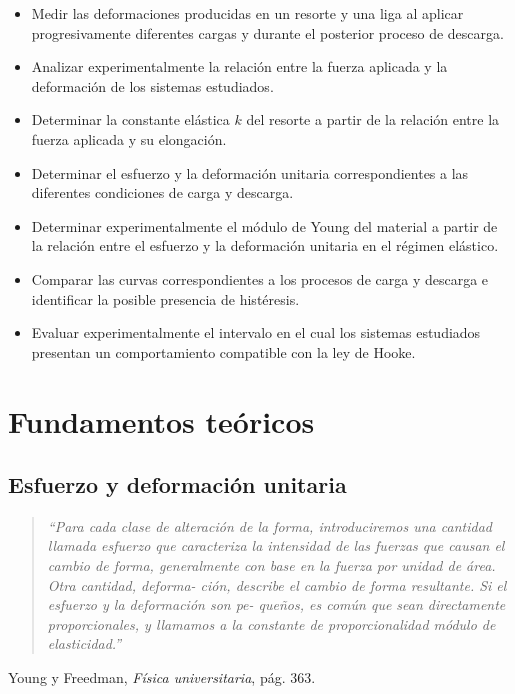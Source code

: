 \documentclass[11pt,a4paper]{article}
\begin{document}
\begin{itemize}
    \item Medir las deformaciones producidas en un resorte y una liga al aplicar progresivamente diferentes cargas y durante el posterior proceso de descarga.

    \item Analizar experimentalmente la relación entre la fuerza aplicada y la deformación de los sistemas estudiados.

    \item Determinar la constante elástica $k$ del resorte a partir de la relación entre la fuerza aplicada y su elongación.

    \item Determinar el esfuerzo y la deformación unitaria correspondientes a las diferentes condiciones de carga y descarga.

    \item Determinar experimentalmente el módulo de Young del material a partir de la relación entre el esfuerzo y la deformación unitaria en el régimen elástico.

    \item Comparar las curvas correspondientes a los procesos de carga y descarga e identificar la posible presencia de histéresis.

    \item Evaluar experimentalmente el intervalo en el cual los sistemas estudiados presentan un comportamiento compatible con la ley de Hooke.
\end{itemize}

\newpage
\section{Fundamentos teóricos}
\begingroup
\setlength{\leftskip}{1.5em}

\subsection{Esfuerzo y deformación unitaria}

\begin{quote}
\textit{``Para cada clase de alteración de la forma, introduciremos una cantidad llamada
esfuerzo que caracteriza la intensidad de las fuerzas que causan el cambio de forma,
generalmente con base en la fuerza por unidad de área. Otra cantidad, deforma-
ción, describe el cambio de forma resultante. Si el esfuerzo y la deformación son pe-
queños, es común que sean directamente proporcionales, y llamamos a la constante
de proporcionalidad módulo de elasticidad.''}
\end{quote}
\hfill Young y Freedman, \textit{Física universitaria}, pág. 363.
\end{document}
